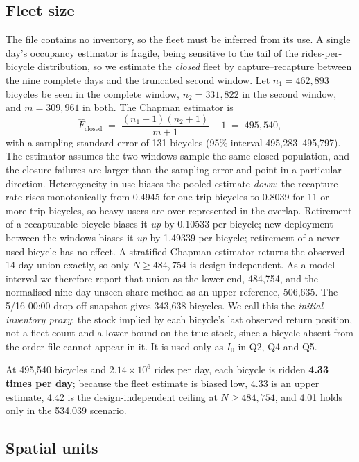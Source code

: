 \subsection{Fleet size}

The file contains no inventory, so the fleet must be inferred from its use.
A single day's occupancy estimator is fragile, being sensitive to the tail of
the rides-per-bicycle distribution, so we estimate the \emph{closed} fleet by
capture--recapture between the nine complete days and the truncated second window.
Let $n_1=462{,}893$ bicycles be seen in the complete window, $n_2=331{,}822$ in the
second window, and $m=309{,}961$ in both. The Chapman estimator is
\begin{equation}
\hat F_{\text{closed}} \;=\;
\frac{(n_1+1)(n_2+1)}{m+1}-1 \;=\; 495{,}540,
\label{eq:fleet}
\end{equation}
with a sampling standard error of 131 bicycles (95\% interval 495,283--495,797).
The estimator assumes the two windows sample the same closed population, and the
closure failures are larger than the sampling error and point in a particular
direction. Heterogeneity in use biases the pooled estimate \emph{down}: the recapture
rate rises monotonically from 0.4945 for one-trip bicycles to 0.8039 for 11-or-more-trip
bicycles, so heavy users are over-represented in the overlap. Retirement of a
recapturable bicycle biases it \emph{up} by 0.10533 per bicycle; new deployment between
the windows biases it \emph{up} by 1.49339 per bicycle; retirement of a never-used
bicycle has no effect. A stratified Chapman estimator returns the observed 14-day union
exactly, so only $N\ge484{,}754$ is design-independent. As a model interval we therefore
report that union as the lower end, 484,754, and the normalised nine-day unseen-share
method as an upper reference, 506,635. The 5/16 00:00 drop-off snapshot gives 343,638
bicycles. We call this the \emph{initial-inventory proxy}: the stock implied by each
bicycle's last observed return position, not a fleet count and a lower bound on the
true stock, since a bicycle absent from the order file cannot appear in it. It is used
only as $I_0$ in Q2, Q4 and Q5.

At 495,540 bicycles and $2.14\times10^6$ rides per day, each bicycle is ridden
\textbf{4.33 times per day}; because the fleet estimate is biased low, 4.33 is an upper
estimate, 4.42 is the design-independent ceiling at $N\ge484{,}754$, and 4.01 holds only
in the 534,039 scenario.

\subsection{Spatial units}

